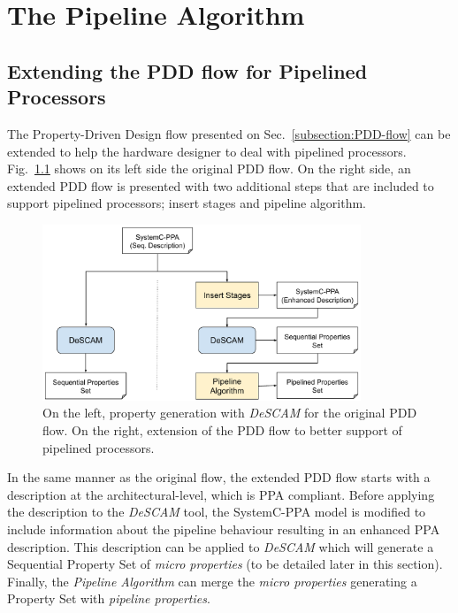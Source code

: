 \chapter{The Pipeline Algorithm}
\label{chapter:algorithm}


\section{Extending the PDD flow for Pipelined Processors}

The Property-Driven Design flow presented on Sec.~\ref{subsection:PDD-flow} can be extended to help the hardware designer to deal with pipelined processors. Fig.~\ref{fig:new-pdd-flow} shows on its left side the original PDD flow. On the right side, an extended PDD flow is presented with two additional steps that are included to support pipelined processors; insert stages and pipeline algorithm. 

\begin{figure}[htb!]
	\centering
	\includegraphics[width=0.85\textwidth]{images/new_pdd_flow.pdf}
	\caption{On the left, property generation with \textit{DeSCAM} for the original PDD flow. On the right, extension of the PDD flow to better support of pipelined processors.}
	\label{fig:new-pdd-flow}
\end{figure}

In the same manner as the original flow, the extended PDD flow starts with a description at the architectural-level, which is PPA compliant. Before applying the description to the \textit{DeSCAM} tool, the SystemC-PPA model is modified to include information about the pipeline behaviour resulting in an enhanced PPA description. This description can be applied to \textit{DeSCAM} which will generate a Sequential Property Set of \textit{micro properties} (to be detailed later in this section). Finally, the \textit{Pipeline Algorithm} can merge the \textit{micro properties} generating a Property Set with \textit{pipeline properties}.

